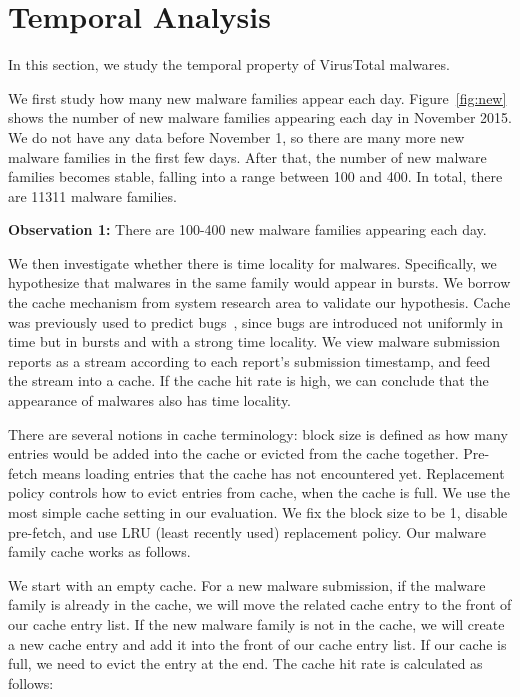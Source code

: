 
\section{Temporal Analysis}
\label{sec:temporal}

In this section, we study the temporal property of VirusTotal malwares. 




We first study how many new malware families appear each day. 
Figure~\ref{fig:new} shows the number of new malware families appearing each day in November 2015. 
We do not have any data before November 1, 
so there are many more new malware families in the first few days.
After that, the number of new malware families becomes stable, falling into a range between 100 and 400. 
In total, there are 11311 malware families. 

{\bf Observation 1:} 
There are 100-400 new malware families appearing each day. 







We then investigate whether there is time locality for malwares.
Specifically, we hypothesize that malwares in the same family would appear in bursts.  
We borrow the cache mechanism from system research area to validate our hypothesis. 
Cache was previously used to predict bugs~\cite{predicting}, 
since bugs are introduced not uniformly in time but in bursts and with a strong time locality. 
We view malware submission reports as a stream according to each report's submission timestamp, and feed the stream into a cache. 
If the cache hit rate is high, 
we can conclude that the appearance of malwares also has time locality. 

There are several notions in cache terminology: 
block size is defined as how many entries would be added into the cache or evicted from the cache together.
Pre-fetch means loading entries that the cache has not encountered yet. 
Replacement policy controls how to evict entries from cache, when the cache is full. 
We use the most simple cache setting in our evaluation. We fix the block size to be 1, disable pre-fetch, 
and use LRU (least recently used) replacement policy.
Our malware family cache works as follows.

We start with an empty cache. 
For a new malware submission, if the malware family is already in the cache, 
we will move the related cache entry to the front of our cache entry list. 
If the new malware family is not in the cache, 
we will create a new cache entry and add it into the front of our cache entry list. 
If our cache is full, we need to evict the entry at the end. 
The cache hit rate is calculated as follows: 

